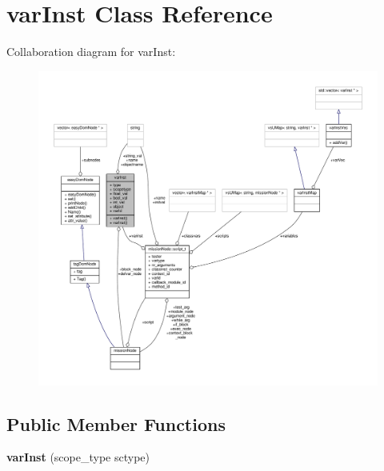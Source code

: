 \hypertarget{classvarInst}{}\section{var\+Inst Class Reference}
\label{classvarInst}


Collaboration diagram for var\+Inst\+:
\nopagebreak
\begin{figure}[H]
\begin{center}
\leavevmode
\includegraphics[width=350pt]{de/d01/classvarInst__coll__graph}
\end{center}
\end{figure}
\subsection*{Public Member Functions}
\begin{DoxyCompactItemize}
\item 
{\bfseries var\+Inst} (scope\+\_\+type sctype)\hypertarget{classvarInst_ae1b80adfa99fb569334586761a717078}{}\label{classvarInst_ae1b80adfa99fb569334586761a717078}

\end{DoxyCompactItemize}
